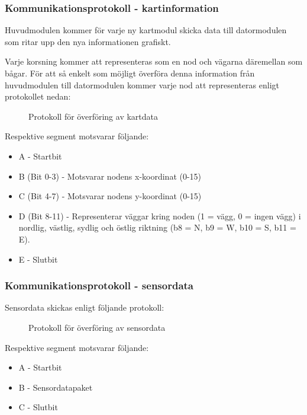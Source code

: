 \documentclass[11pt]{article}
\begin{document}
\begin{flushleft}
\subsubsection{Kommunikationsprotokoll - kartinformation}
Huvudmodulen kommer för varje ny kartmodul skicka data till datormodulen som ritar upp den nya informationen grafiskt. 

Varje korsning kommer att representeras som en nod och vägarna däremellan som bågar. För att så enkelt som möjligt överföra denna information från huvudmodulen till datormodulen kommer varje nod att representeras enligt protokollet nedan:

 \begin{figure}[H]
\centering
\noindent\resizebox{.8\linewidth}{!}{
	}
	\caption{Protokoll för överföring av kartdata \label{kartdata}}	
\end{figure} 

Respektive segment motsvarar följande: 
\begin{itemize}
	\item A - Startbit
	\item B (Bit 0-3) - Motsvarar nodens x-koordinat (0-15)
	\item C (Bit 4-7) - Motsvarar nodens y-koordinat (0-15)
	\item D (Bit 8-11) - Representerar väggar kring noden (1 = vägg, 0 = ingen vägg) i nordlig, västlig, sydlig och östlig riktning (b8 = N, b9 = W, b10 = S, b11 = E).
	\item E - Slutbit
\end{itemize}

\subsubsection{Kommunikationsprotokoll - sensordata}
Sensordata skickas enligt följande protokoll:

 \begin{figure}[H]
\centering
\noindent\resizebox{.8\linewidth}{!}{
	}
	\caption{Protokoll för överföring av sensordata\label{sensordata}}	
\end{figure} 

Respektive segment motsvarar följande: 
\begin{itemize}
	\item A - Startbit
	\item B - Sensordatapaket
	\item C - Slutbit
\end{itemize}


\end{flushleft}
\end{document}
